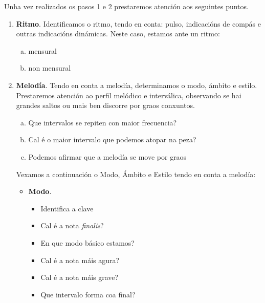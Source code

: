 \begin{multicols}{2}
Unha vez realizados os pasos 1 e 2 prestaremos atención aos seguintes puntos.
%
    \begin{enumerate}[1.-]
        \item %
        \textbf{Ritmo}. Identificamos o ritmo, tendo en conta: pulso, indicacións de compás e outras indicacións dinámicas. 
        Neste caso, estamos ante un ritmo:
        \begin{enumerate}[a)]
            \item mensural 
            \item non mensural 
        \end{enumerate}
        \item %
        \textbf{Melodía}. Tendo en conta a melodía, determinamos o modo, ámbito e estilo. Prestaremos atención ao perfil melódico e interválica, observando se hai grandes saltos ou mais ben discorre por graos conxuntos.
        \begin{enumerate}[a)]
            \item 
            Que intervalos se repiten con maior frecuencia? \dotfill
            \item 
            Cal é o maior intervalo que podemos atopar na peza? \dotfill
            \item
            Podemos afirmar que a melodía se move por graos \dotfill
        \end{enumerate}
        Vexamos a continuación o Modo, Ámbito e Estilo tendo en conta a melodía:
        \begin{itemize}
            \item %
            \textbf{Modo}.
        \begin{itemize}            
            \item 
            Identifica a clave \dotfill
            \item 
            Cal é a nota \textit{finalis}? \dotfill
            \item
            En que modo básico estamos? \dotfill
            \item
            Cal é a nota máis agura? \dotfill 
            \item
            Cal é a nota máis grave? \dotfill 
            \item
            Que intervalo forma coa final? \dotfill

\end{itemize}
\end{itemize}
\end{enumerate}
\end{multicols}
